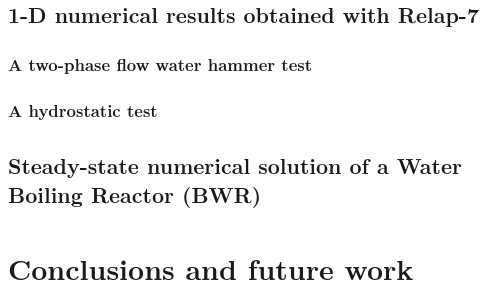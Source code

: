 \documentclass[preprint,10pt]{elsarticle}
\begin{document}
\subsection{1-D numerical results obtained with Relap-7}\label{sec:1d-results-relap-7}
%
%
\subsubsection{A two-phase flow water hammer test}\label{sec:water-hammer}
%
%
\subsubsection{A hydrostatic test}\label{sec:}
%
%
\subsection{Steady-state numerical solution of a Water Boiling Reactor (BWR)}\label{sec:bwr}
%
\section{Conclusions and future work}\label{sec:conclusion}

\end{document}
